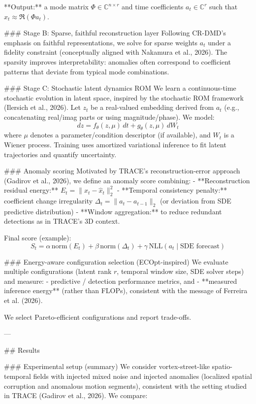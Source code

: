 **Output:** a mode matrix \(\Phi \in \mathbb{C}^{n \times r}\) and time coefficients \(a_t \in \mathbb{C}^r\) such that \(x_t \approx \Re(\Phi a_t)\).

### Stage B: Sparse, faithful reconstruction layer  
Following CR-DMD’s emphasis on faithful representations, we solve for sparse weights \(a_t\) under a fidelity constraint (conceptually aligned with Nakamura et al., 2026). The sparsity improves interpretability: anomalies often correspond to coefficient patterns that deviate from typical mode combinations.

### Stage C: Stochastic latent dynamics ROM  
We learn a continuous-time stochastic evolution in latent space, inspired by the stochastic ROM framework (Ilersich et al., 2026). Let \(z_t\) be a real-valued embedding derived from \(a_t\) (e.g., concatenating real/imag parts or using magnitude/phase). We model:
\[
dz = f_\theta(z, \mu)\,dt + g_\theta(z, \mu)\,dW_t
\]
where \(\mu\) denotes a parameter/condition descriptor (if available), and \(W_t\) is a Wiener process. Training uses amortized variational inference to fit latent trajectories and quantify uncertainty.

### Anomaly scoring  
Motivated by TRACE’s reconstruction-error approach (Gadirov et al., 2026), we define an anomaly score combining:
- **Reconstruction residual energy:** \(E_t = \|x_t - \hat{x}_t\|_2^2\)  
- **Temporal consistency penalty:** coefficient change irregularity \(\Delta_t = \|a_t-a_{t-1}\|_2\) (or deviation from SDE predictive distribution)  
- **Window aggregation:** to reduce redundant detections as in TRACE’s 3D context.

Final score (example):
\[
S_t = \alpha \,\text{norm}(E_t) + \beta\,\text{norm}(\Delta_t) + \gamma\,\text{NLL}(a_t \mid \text{SDE forecast})
\]

### Energy-aware configuration selection (ECOpt-inspired)  
We evaluate multiple configurations (latent rank \(r\), temporal window size, SDE solver steps) and measure:
- predictive / detection performance metrics, and  
- **measured inference energy** (rather than FLOPs), consistent with the message of Ferreira et al. (2026).

We select Pareto-efficient configurations and report trade-offs.

---

## Results  

### Experimental setup (summary)  
We consider vortex-street-like spatio-temporal fields with injected mixed noise and injected anomalies (localized spatial corruption and anomalous motion segments), consistent with the setting studied in TRACE (Gadirov et al., 2026). We compare:

